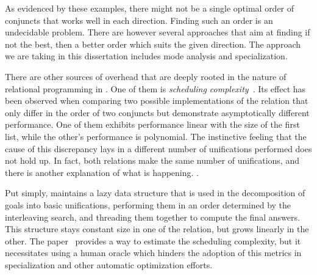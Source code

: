 As evidenced by these examples, there might not be a single optimal order of conjuncts that works well in each direction. 
Finding such an order is  an undecidable problem. 
There are however several approaches that aim at finding if not the best, then a better order which suits the given direction. 
The approach we are taking in this dissertation includes mode analysis and specialization. 

There are other sources of overhead that are deeply rooted in the nature of relational programming in \mk. 
One of them is \emph{scheduling complexity}~\cite{rozplokhas2022scheduling}. 
Its effect has been observed when comparing two possible implementations of the  relation that only differ in the order of two conjuncts but demonstrate asymptotically different performance. 
One of them exhibits performance linear with the size of the first list, while the other's performance is polynomial. 
The instinctive feeling that the cause of this discrepancy lays in a different number of unifications performed does not hold up. 
In fact, both relations make the same number of unifications, and there is another explanation of what is happening. 
. 

Put simply, \mk maintains a lazy data structure that is used in the decomposition of goals into basic unifications, performing them in an order determined by the interleaving search, and threading them together to compute the final answers. 
This structure stays constant size in one of the relation, but grows linearly in the other. 
The paper~\cite{rozplokhas2022scheduling} provides a way to estimate the scheduling complexity, but it necessitates using a human oracle which hinders the adoption of this metrics in specialization and other automatic optimization efforts. 



